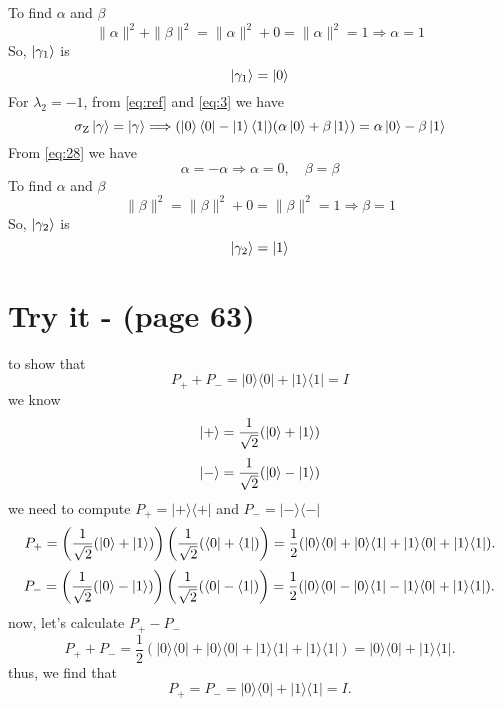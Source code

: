 \documentclass[12pt]{article}
\begin{document}
To find $\alpha$ and $\beta$
\begin{equation}
    \|\alpha\|^2 + \|\beta\|^2 = \|\alpha\|^2 + 0 = \|\alpha\|^2 = 1 \Longrightarrow \alpha = 1
\end{equation}
So, $\ket{\gamma_{1}}$ is
\begin{equation}
    \ket{\gamma_{1}} = \ket{0}
\end{equation}
For $\lambda_2 = -1$, from \ref{eq:ref} and \ref{eq:3} we have
\begin{equation}
    \label{eq:28}
    \sigma_{\textnormal{Z}}\ket{\gamma} = \ket{\gamma} \Longrightarrow (\ket{0}\bra{0} - \ket{1}\bra{1})(\alpha\ket{0}+\beta\ket{1}) = \alpha\ket{0}-\beta\ket{1}
\end{equation}
From \ref{eq:28} we have
\begin{equation}
    \alpha = -\alpha \Longrightarrow \alpha = 0, \quad \beta = \beta
\end{equation}
To find $\alpha$ and $\beta$
\begin{equation}
\|\beta\|^2 = \|\beta\|^2 + 0 = \|\beta\|^2 = 1 \Longrightarrow \beta = 1
\end{equation}
So, $\ket{\gamma_{2}}$ is
\begin{equation}
    \ket{\gamma_{2}} = \ket{1}
\end{equation}

\section*{Try it - (page 63)}
to show that 
\[
P_+ + P_- = |0\rangle \langle 0| + |1\rangle \langle 1| = I
\]
we know
\[
\ket{+} = \frac{1}{\sqrt{2}} (\ket{0} + \ket{1})
\]
\[
\ket{-} = \frac{1}{\sqrt{2}} (\ket{0} - \ket{1})
\]
we need to compute \( P_+ = |+\rangle \langle +| \) and \( P_- = |-\rangle \langle -| \)
\[
P_+ = \left( \frac{1}{\sqrt{2}} (\ket{0} + \ket{1}) \right) \left( \frac{1}{\sqrt{2}} (\bra{0} + \bra{1}) \right) = \frac{1}{2} (|0\rangle \langle 0| + |0\rangle \langle 1| + |1\rangle \langle 0| + |1\rangle \langle 1|).
\]
\[
P_- = \left( \frac{1}{\sqrt{2}} (\ket{0} - \ket{1}) \right) \left( \frac{1}{\sqrt{2}} (\bra{0} - \bra{1}) \right) = \frac{1}{2} (|0\rangle \langle 0| - |0\rangle \langle 1| - |1\rangle \langle 0| + |1\rangle \langle 1|).
\]
now, let's calculate \( P_+ - P_- \)
\[
P_+ + P_- =  \frac{1}{2} (|0\rangle \langle 0| + |0\rangle \langle 0| + |1\rangle \langle 1| + |1\rangle \langle 1|) = |0\rangle \langle 0| + |1\rangle \langle 1|.
\]
thus, we find that
\[
P_+ = P_- = |0\rangle \langle 0| + |1\rangle \langle 1| = I.
\]
\end{document}
